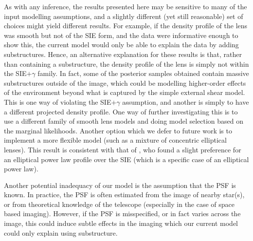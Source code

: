 \documentclass[useAMS,usenatbib]{mn2e}
\begin{document}
As with any inference, the results presented here may be sensitive to many of
the input modelling assumptions, and a slightly different (yet still
reasonable) set of choices might yield different results. For example, if
the density profile of the lens was smooth but not of the SIE form, and the
data were informative enough to show this, the current
model would only be able to explain the data by adding substructures. Hence, an alternative explanation for these results is that, rather than containing a substructure, the density profile of the lens is simply not within the SIE$+\gamma$ family. In fact, some of the posterior
samples obtained contain massive substructures outside of the image, which
could be modelling higher-order effects of the environment beyond what is
captured by the simple external shear model. This is one way of violating
the SIE$+\gamma$ assumption, and another is simply to have a different projected
density profile.
One way of further investigating this is to use a different family of
smooth lens models and doing model selection based on the marginal likelihoods.
Another option which we defer to future work is to implement a more flexible
model (such as a mixture of concentric elliptical lenses). This
result is consistent with that of \citet{2008MNRAS.388..384D}, who found a slight preference for an elliptical power law profile over the SIE
(which is a specific case of an elliptical power law).

Another potential inadequacy of our model is the assumption that the PSF is
known. In practice, the PSF is often estimated from the image of nearby star(s),
or from theoretical knowledge of the telescope (especially in the case of
space based imaging). However, if the PSF is misspecified, or in fact varies
across the image, this could induce subtle effects in the imaging which our
current model could only explain using substructure.
\end{document}
